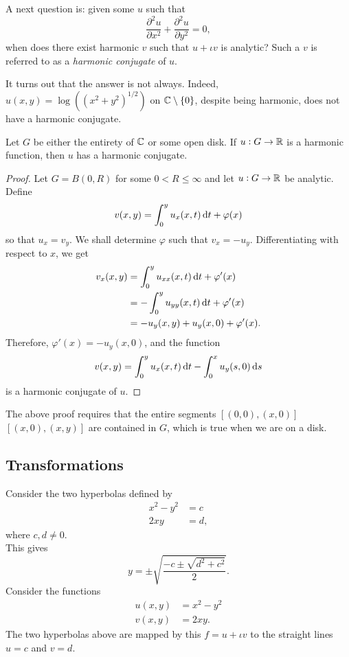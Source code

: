 	A next question is: given some $u$ such that
	\[ \frac{\partial^2 u}{\partial x^2} + \frac{\partial^2 u}{\partial y^2} = 0, \]
	when does there exist harmonic $v$ such that $u + \iota v$ is analytic? Such a $v$ is referred to as a \emph{harmonic conjugate} of $u$.

	It turns out that the answer is not always. Indeed, $u(x,y) = \log((x^2+y^2)^{1/2})$ on $\mathbb{C}\setminus\{0\}$, despite being harmonic, does not have a harmonic conjugate.

	\begin{ftheo}
		\label{theo: open disk harmonic conjugate}
		Let $G$ be either the entirety of $\mathbb{C}$ or some open disk. If $u : G \to \mathbb{R}$ is a harmonic function, then $u$ has a harmonic conjugate.
	\end{ftheo}
	\begin{proof}
		Let $G = B(0,R)$ for some $0 < R \le \infty$ and let $u : G \to \mathbb{R}$ be analytic. Define
		\[ v(x,y) = \int_0^y u_x(x,t) \dif t + \varphi(x) \]
		so that $u_x = v_y$. We shall determine $\varphi$ such that $v_x = - u_y$. Differentiating with respect to $x$, we get
		\begin{align*}
			v_x(x,y) &= \int_0^y u_{xx}(x,t) \dif t + \varphi'(x) \\
				&= - \int_0^y u_{yy}(x,t) \dif t + \varphi'(x) \\
				&= - u_y(x,y) + u_y(x,0) + \varphi'(x).
		\end{align*}
		Therefore, $\varphi'(x) = - u_y(x,0)$, and the function
		\[ v(x,y) = \int_0^y u_x(x,t) \dif t - \int_0^x u_y(s,0) \dif s \]
		is a harmonic conjugate of $u$.
	\end{proof}

	The above proof requires that the entire segments $[(0,0),(x,0)]$ $[(x,0),(x,y)]$ are contained in $G$, which is true when we are on a disk.

\subsection{Transformations}

	Consider the two hyperbolas defined by
	\begin{align*}
		x^2-y^2 &= c \\
		2xy &= d,
	\end{align*}
	where $c,d \ne 0$.\\
	This gives
	\[ y = \pm \sqrt{ \frac{-c \pm \sqrt{d^2+c^2}}{2} }. \]
	Consider the functions
	\begin{align*}
		u(x,y) &= x^2 - y^2 \\
		v(x,y) &= 2xy.
	\end{align*}
	The two hyperbolas above are mapped by this $f = u + \iota v$ to the straight lines $u=c$ and $v=d$.\\

